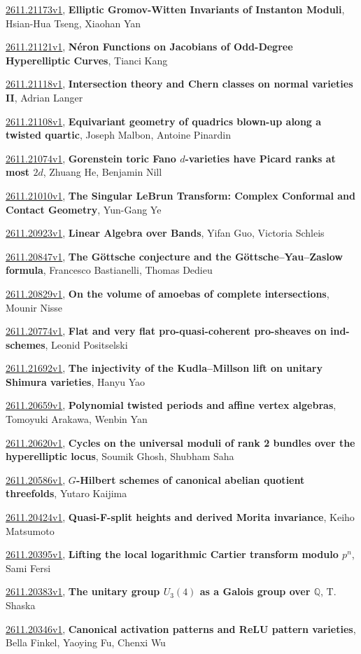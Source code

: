 \documentclass[9pt, a4paper]{article}
\theoremstyle{plain}
\theoremstyle{definition}
\theoremstyle{remark}
\newcommand{\arxiv}[3]{\href{https://arxiv.org/abs/#1}{#1}, \textbf{\textcolor{arxivblue}{#2}}, #3}
\begin{document}
\arxiv{2611.21173v1}{Elliptic Gromov-Witten Invariants of Instanton Moduli}{Hsian-Hua Tseng, Xiaohan Yan}

\arxiv{2611.21121v1}{Néron Functions on Jacobians of Odd-Degree Hyperelliptic Curves}{Tianci Kang}

\arxiv{2611.21118v1}{Intersection theory and Chern classes on normal varieties II}{Adrian Langer}

\arxiv{2611.21108v1}{Equivariant geometry of quadrics blown-up along a twisted quartic}{Joseph Malbon, Antoine Pinardin}

\arxiv{2611.21074v1}{Gorenstein toric Fano $d$-varieties have Picard ranks at most $2d$}{Zhuang He, Benjamin Nill}

\arxiv{2611.21010v1}{The Singular LeBrun Transform: Complex Conformal and Contact Geometry}{Yun-Gang Ye}

\arxiv{2611.20923v1}{Linear Algebra over Bands}{Yifan Guo, Victoria Schleis}

\arxiv{2611.20847v1}{The Göttsche conjecture and the Göttsche--Yau--Zaslow formula}{Francesco Bastianelli, Thomas Dedieu}

\arxiv{2611.20829v1}{On the volume of amoebas of complete intersections}{Mounir Nisse}

\arxiv{2611.20774v1}{Flat and very flat pro-quasi-coherent pro-sheaves on ind-schemes}{Leonid Positselski}

\arxiv{2611.21692v1}{The injectivity of the Kudla--Millson lift on unitary Shimura varieties}{Hanyu Yao}

\arxiv{2611.20659v1}{Polynomial twisted periods and affine vertex algebras}{Tomoyuki Arakawa, Wenbin Yan}

\arxiv{2611.20620v1}{Cycles on the universal moduli of rank 2 bundles over the hyperelliptic locus}{Soumik Ghosh, Shubham Saha}

\arxiv{2611.20586v1}{$G$-Hilbert schemes of canonical abelian quotient threefolds}{Yutaro Kaijima}

\arxiv{2611.20424v1}{Quasi-F-split heights and derived Morita invariance}{Keiho Matsumoto}

\arxiv{2611.20395v1}{Lifting the local logarithmic Cartier transform modulo $p^n$}{Sami Fersi}

\arxiv{2611.20383v1}{The unitary group $U_3(4)$ as a Galois group over $\mathbb{Q}$}{T. Shaska}

\arxiv{2611.20346v1}{Canonical activation patterns and ReLU pattern varieties}{Bella Finkel, Yaoying Fu, Chenxi Wu}
\end{document}

